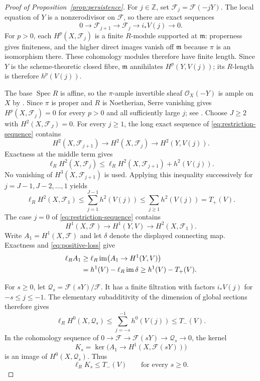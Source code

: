 \documentclass[11pt,reqno]{amsart}
\numberwithin{equation}{section}
\theoremstyle{definition}
\theoremstyle{remark}
\newcommand{\Z}{\mathbb Z}
\newcommand{\OO}{\mathcal O}
\newcommand{\FF}{\mathcal F}
\newcommand{\QQ}{\mathcal Q}
\newcommand{\mm}{\mathfrak m}
\newcommand{\Spec}{\operatorname{Spec}}
\newcommand{\im}{\operatorname{im}}
\newcommand{\len}{\ell}
\begin{document}
\begin{proof}[Proof of Proposition~\ref{prop:persistence}]
For $j\in\Z$, set $\FF_j=\FF(-jY)$. The local equation of $Y$ is
a nonzerodivisor on $\FF$, so there are exact sequences
\begin{equation}\label{eq:restriction-sequence}
 0\longrightarrow\FF_{j+1}\longrightarrow\FF_j
  \longrightarrow i_*V(j)\longrightarrow0.
\end{equation}
For $p>0$, each $H^p(X,\FF_j)$ is a finite $R$-module supported at
$\mm$: properness gives finiteness, and the higher direct images
vanish off $\mm$ because $\pi$ is an isomorphism there. These
cohomology modules therefore have finite length. Since $Y$ is the
scheme-theoretic closed fibre, $\mm$ annihilates $H^p(Y,V(j))$;
its $R$-length is therefore $h^p(V(j))$.

The base $\Spec R$ is affine, so the $\pi$-ample invertible sheaf
$\OO_X(-Y)$ is ample on $X$ by \cite[Tag 01VK]{Stacks}.
Since $\pi$ is proper and $R$ is Noetherian, Serre vanishing gives
$H^p(X,\FF_j)=0$ for every $p>0$ and all sufficiently large $j$;
see \cite[Tag 0B5U]{Stacks}. Choose $J\geq2$ with
$H^2(X,\FF_J)=0$.
For every $j\geq1$, the long exact sequence of
\eqref{eq:restriction-sequence} contains
\[
 H^2(X,\FF_{j+1})\longrightarrow H^2(X,\FF_j)
       \longrightarrow H^2(Y,V(j)).
\]
Exactness at the middle term gives
\[
 \len_R H^2(X,\FF_j)
 \leq\len_R H^2(X,\FF_{j+1})+h^2(V(j)).
\]
No vanishing of $H^3(X,\FF_{j+1})$ is used. Applying this inequality
successively for $j=J-1,J-2,\ldots,1$ yields
\begin{equation}\label{eq:positive-loss}
 \len_R H^2(X,\FF_1)
 \leq\sum_{j=1}^{J-1}h^2(V(j))
 \leq\sum_{j\geq1}h^2(V(j))=T_+(V).
\end{equation}
The case $j=0$ of \eqref{eq:restriction-sequence} contains
\[
 H^1(X,\FF)\longrightarrow H^1(Y,V)
       \longrightarrow H^2(X,\FF_1).
\]
Write $A_1=H^1(X,\FF)$ and let $\delta$ denote the displayed connecting
map. Exactness and \eqref{eq:positive-loss} give
\begin{align}
 \len_R A_1
 &\geq\len_R\im\bigl(A_1\to H^1(Y,V)\bigr)\notag\\
 &=h^1(V)-\len_R\im\delta
 \geq h^1(V)-T_+(V).
 \label{eq:fixed-source-length}
\end{align}

For $s\geq0$, let $\QQ_s=\FF(sY)/\FF$. It has a finite filtration
with factors $i_*V(j)$ for $-s\leq j\leq-1$. The elementary
subadditivity of the dimension of global sections therefore gives
\[
 \len_R H^0(X,\QQ_s)
       \leq\sum_{j=-s}^{-1}h^0(V(j))\leq T_-(V).
\]
In the cohomology sequence of
$0\to\FF\to\FF(sY)\to\QQ_s\to0$, the kernel
\begin{equation}\label{eq:fixed-kernel}
 K_s=\ker\bigl(A_1\longrightarrow H^1(X,\FF(sY))\bigr)
\end{equation}
is an image of $H^0(X,\QQ_s)$. Thus
\begin{equation}\label{eq:negative-loss}
 \len_R K_s\leq T_-(V)\qquad\text{for every }s\geq0.
\end{equation}


\end{proof}
\end{document}
